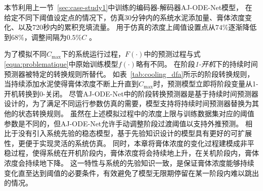 本节利用上一节~\ref{sec:case-study1}中训练的编码器-解码器AJ-ODE-Net模型，
在给定不同下阈值设定点的情况下，仿真30分钟内的系统水泥添加量、膏体浓度变化、以及720秒内的累积充填流量。
用于仿真的浓度上阈值设置点从$74\%$逐渐降低到$68\%$，调整间隔为$0.5\%C$ 。

为了模拟不同$C_{\max}$下的系统运行过程，$F(\cdot)$中的预测过程与式\ref{equa:problematique}中原始训练模型$f(\cdot)$略有不同。
在阶段\textit{1-开机}下的持续时间预测器被特定的转换规则所替代。
如表~\ref{tab:cooling_dfa}所示的阶段转换规则，当持续添加水泥使得膏体浓度不断上升直到$C_{\max}$时，预测模型立即将阶段变量从1-开机转换到0-关闭。
尽管AJ-ODE-Net中的阶段转换预测器是基于持续时间预测器设计的，为了满足不同运行参数仿真的需要，模型支持将持续时间预测器替换为其他的状态转换规则。
虽然在上述模拟过程中的浓度上限与训练数据集对应的阈值参数是不同的，但AJ-ODE-Net允许手动调整阶段过渡阈值以支持外推预测。
相比于没有引入系统先验的稳态模型，基于先验知识设计的模型具有更好的可扩展性，更便于实现灵活的系统仿真。
同时，本章将膏体浓度的变化过程建模成非平稳过程，使得系统在开机阶段内，膏体浓度将会持续地上升，在关机阶段内，膏体浓度会持续地下降。
这一特性与系统的先验知识一致，是保证膏体浓度能够持续变化直至达到阈值的必要条件，有效避免了模型无限期停留在某一阶段内难以跳出的情况。

